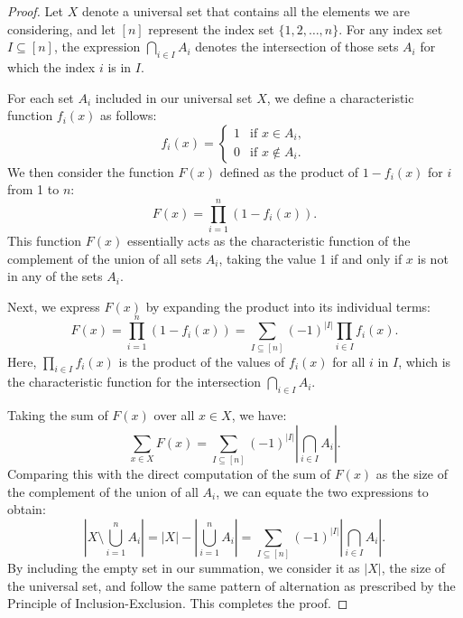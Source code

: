    \begin{proof}
        Let \( X \) denote a universal set that contains all the elements we are considering, and let \( [n] \) represent the index set \( \{1, 2, \ldots, n\} \). For any index set \( I \subseteq [n] \), the expression \( \bigcap_{i \in I} A_i \) denotes the intersection of those sets \( A_i \) for which the index \( i \) is in \( I \).
        
        For each set \( A_i \) included in our universal set \( X \), we define a characteristic function \( f_i(x) \) as follows:
        \[
        f_i(x) = 
        \begin{cases}
        1 & \text{if } x \in A_i, \\
        0 & \text{if } x \notin A_i.
        \end{cases}
        \]
        We then consider the function \( F(x) \) defined as the product of \( 1 - f_i(x) \) for \( i \) from 1 to \( n \):
        \[
        F(x) = \prod_{i=1}^{n} (1 - f_i(x)).
        \]
        This function \( F(x) \) essentially acts as the characteristic function of the complement of the union of all sets \( A_i \), taking the value 1 if and only if \( x \) is not in any of the sets \( A_i \).
        
        Next, we express \( F(x) \) by expanding the product into its individual terms:
        \[
        F(x) = \prod_{i=1}^{n} (1 - f_i(x)) = \sum_{I \subseteq [n]} (-1)^{|I|} \prod_{i \in I} f_i(x).
        \]
        Here, \( \prod_{i \in I} f_i(x) \) is the product of the values of \( f_i(x) \) for all \( i \) in \( I \), which is the characteristic function for the intersection \( \bigcap_{i \in I} A_i \).
        
        Taking the sum of \( F(x) \) over all \( x \in X \), we have:
        \[
        \sum_{x \in X} F(x) = \sum_{I \subseteq [n]} (-1)^{|I|} \left|\bigcap_{i \in I} A_i\right|.
        \]
        Comparing this with the direct computation of the sum of \( F(x) \) as the size of the complement of the union of all \( A_i \), we can equate the two expressions to obtain:
        \[
        \left|X \setminus \bigcup_{i=1}^{n} A_i\right| = \left|X\right| - \left|\bigcup_{i=1}^{n} A_i\right| = \sum_{I \subseteq [n]} (-1)^{|I|} \left|\bigcap_{i \in I} A_i\right|.
        \]
        By including the empty set in our summation, we consider it as \( \left|X\right| \), the size of the universal set, and follow the same pattern of alternation as prescribed by the Principle of Inclusion-Exclusion. This completes the proof.
    \end{proof}
    
